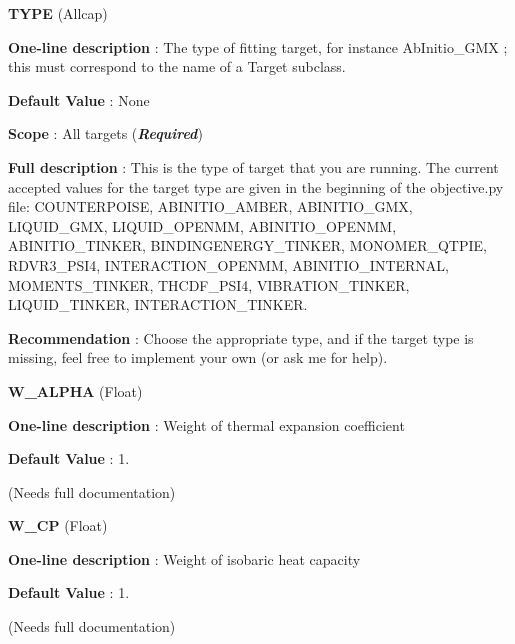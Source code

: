 \begin{DoxyItemize}
\item {\bfseries  \-T\-Y\-P\-E } (\-Allcap) \par
{\bfseries  \-One-\/line description }\-: \-The type of fitting target, for instance \-Ab\-Initio\-\_\-\-G\-M\-X ; this must correspond to the name of a \-Target subclass. \par
{\bfseries  \-Default \-Value }\-: \-None \par
{\bfseries  \-Scope }\-: \-All targets ({\bfseries {\itshape \-Required\/}}) \par
{\bfseries  \-Full description }\-: \-This is the type of target that you are running. \-The current accepted values for the target type are given in the beginning of the objective.\-py file\-: \-C\-O\-U\-N\-T\-E\-R\-P\-O\-I\-S\-E, \-A\-B\-I\-N\-I\-T\-I\-O\-\_\-\-A\-M\-B\-E\-R, \-A\-B\-I\-N\-I\-T\-I\-O\-\_\-\-G\-M\-X, \-L\-I\-Q\-U\-I\-D\-\_\-\-G\-M\-X, \-L\-I\-Q\-U\-I\-D\-\_\-\-O\-P\-E\-N\-M\-M, \-A\-B\-I\-N\-I\-T\-I\-O\-\_\-\-O\-P\-E\-N\-M\-M, \-A\-B\-I\-N\-I\-T\-I\-O\-\_\-\-T\-I\-N\-K\-E\-R, \-B\-I\-N\-D\-I\-N\-G\-E\-N\-E\-R\-G\-Y\-\_\-\-T\-I\-N\-K\-E\-R, \-M\-O\-N\-O\-M\-E\-R\-\_\-\-Q\-T\-P\-I\-E, \-R\-D\-V\-R3\-\_\-\-P\-S\-I4, \-I\-N\-T\-E\-R\-A\-C\-T\-I\-O\-N\-\_\-\-O\-P\-E\-N\-M\-M, \-A\-B\-I\-N\-I\-T\-I\-O\-\_\-\-I\-N\-T\-E\-R\-N\-A\-L, \-M\-O\-M\-E\-N\-T\-S\-\_\-\-T\-I\-N\-K\-E\-R, \-T\-H\-C\-D\-F\-\_\-\-P\-S\-I4, \-V\-I\-B\-R\-A\-T\-I\-O\-N\-\_\-\-T\-I\-N\-K\-E\-R, \-L\-I\-Q\-U\-I\-D\-\_\-\-T\-I\-N\-K\-E\-R, \-I\-N\-T\-E\-R\-A\-C\-T\-I\-O\-N\-\_\-\-T\-I\-N\-K\-E\-R. \par
{\bfseries  \-Recommendation }\-: \-Choose the appropriate type, and if the target type is missing, feel free to implement your own (or ask me for help).\end{DoxyItemize}
\begin{DoxyItemize}
\item {\bfseries  \-W\-\_\-\-A\-L\-P\-H\-A } (\-Float) \par
{\bfseries  \-One-\/line description }\-: \-Weight of thermal expansion coefficient \par
{\bfseries  \-Default \-Value }\-: 1. \par
(\-Needs full documentation)\end{DoxyItemize}
\begin{DoxyItemize}
\item {\bfseries  \-W\-\_\-\-C\-P } (\-Float) \par
{\bfseries  \-One-\/line description }\-: \-Weight of isobaric heat capacity \par
{\bfseries  \-Default \-Value }\-: 1. \par
(\-Needs full documentation)\end{DoxyItemize}
